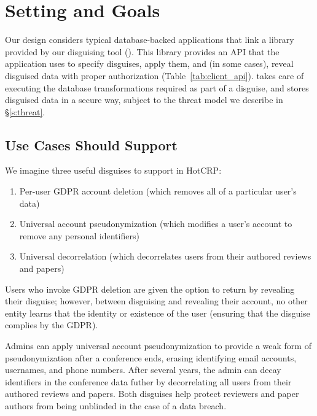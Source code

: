 \section{Setting and Goals}
Our design considers typical database-backed applications that link a library provided by our disguising
tool (\sys).
%
This library provides an API that the application uses to specify disguises, apply them, and (in some
cases), reveal disguised data with proper authorization (Table~\ref{tab:client_api}).
%
\sys takes care of executing the database transformations required as part of a disguise, and stores
disguised data in a secure way, subject to the threat model we describe in \S\ref{s:threat}.

\subsection{Use Cases \sys Should Support}

We imagine three useful disguises to support in HotCRP: 
\begin{enumerate}
    \item Per-user GDPR account deletion (which
removes all of a particular user's data)
        \item Universal account pseudonymization (which modifies a user's
account to remove any personal identifiers)
        \item Universal decorrelation (which decorrelates users from
their authored reviews and papers)
\end{enumerate}

Users who invoke GDPR deletion are given the option to return by revealing their disguise; however,
between disguising and revealing their account, no other entity learns that the identity or
existence of the user (ensuring that the disguise complies by the GDPR).

Admins can apply universal account pseudonymization to provide a weak form of pseudonymization after a
conference ends, erasing \eg identifying email accounts, usernames, and phone numbers. 
After several years, the admin can decay identifiers in the conference data futher by decorrelating
all users from their authored reviews and papers. Both disguises help protect reviewers and paper authors
from being unblinded in the case of a data breach.

